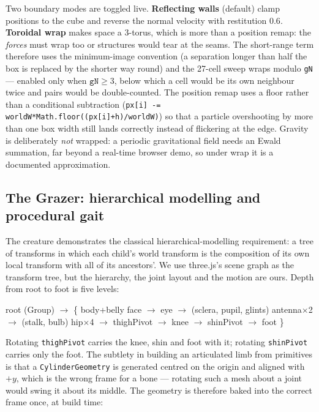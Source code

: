 \documentclass[10pt,a4paper]{article}
\newcommand{\code}[1]{\texttt{\small #1}}
\begin{document}
Two boundary modes are toggled live. \textbf{Reflecting walls} (default) clamp positions to the cube and
reverse the normal velocity with restitution $0.6$. \textbf{Toroidal wrap} makes space a 3-torus, which is
more than a position remap: the \emph{forces} must wrap too or structures would tear at the seams. The
short-range term therefore uses the minimum-image convention (a separation longer than half the box is
replaced by the shorter way round) and the 27-cell sweep wraps modulo \code{gN} --- enabled only when
$\mathtt{gN}\ge3$, below which a cell would be its own neighbour twice and pairs would be double-counted.
The position remap uses a floor rather than a conditional subtraction
(\code{px[i] -= worldW*Math.floor((px[i]+h)/worldW)}) so that a particle overshooting by more than one box
width still lands correctly instead of flickering at the edge. Gravity is deliberately \emph{not} wrapped:
a periodic gravitational field needs an Ewald summation, far beyond a real-time browser demo, so under wrap
it is a documented approximation.

\subsection{The Grazer: hierarchical modelling and procedural gait}
\label{sec:creature}
\label{sec:gait}

The creature demonstrates the classical hierarchical-modelling requirement: a tree of transforms in which
each child's world transform is the composition of its own local transform with all of its ancestors'. We
use three.js's scene graph as the transform tree, but the hierarchy, the joint layout and the motion are
ours. Depth from root to foot is five levels:

\begin{center}
\small\ttfamily
root \textrm{(Group)} $\to$ \{ body+belly \textbar{} face $\to$ eye $\to$ (sclera, pupil, glints)
\textbar{} antenna$\times$2 $\to$ (stalk, bulb) \textbar{} hip$\times$4 $\to$ thighPivot $\to$ knee $\to$
shinPivot $\to$ foot \}
\end{center}

\noindent Rotating \code{thighPivot} carries the knee, shin and foot with it; rotating \code{shinPivot}
carries only the foot. The subtlety in building an articulated limb from primitives is that a
\code{CylinderGeometry} is generated centred on the origin and aligned with $+y$, which is the wrong frame
for a bone --- rotating such a mesh about a joint would swing it about its middle. The geometry is
therefore baked into the correct frame once, at build time:
\end{document}
